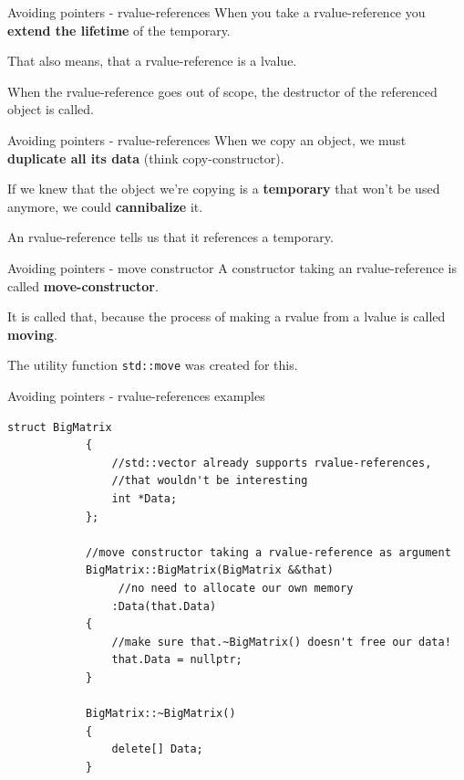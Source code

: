 	\begin{frame}{Avoiding pointers - rvalue-references}
		When you take a rvalue-reference you \textbf{extend the lifetime} of the temporary.
		
		That also means, that a rvalue-reference is a lvalue.
		
		\pause
		
		When the rvalue-reference goes out of scope, the destructor of the referenced object is called.
		
	\end{frame}
	
	\begin{frame}{Avoiding pointers - rvalue-references}
		When we copy an object, we must \textbf{duplicate all its data} (think copy-constructor).
		
		\pause
		
		\emptyline
		If we knew that the object we're copying is a \textbf{temporary} that won't be used anymore, we could \textbf{cannibalize} it.
		
		\pause
		
		\emptyline
		An rvalue-reference tells us that it references a temporary.
	\end{frame}
	
	\begin{frame}{Avoiding pointers - move constructor}
		A constructor taking an rvalue-reference  is called \textbf{move-constructor}.
		
		\pause
		
		\emptyline
		It is called that, because the process of making a rvalue from a lvalue is called \textbf{moving}.
		
		\pause
		
		\emptyline[2]
		The utility function \lstinline|std::move| was created for this.
	\end{frame}
	
	\begin{frame}[fragile=singleslide]{Avoiding pointers - rvalue-references examples}
		\begin{lstlisting}[gobble=12]
			struct BigMatrix
			{
			    //std::vector already supports rvalue-references,
			    //that wouldn't be interesting
			    int *Data;
			};
			
			//move constructor taking a rvalue-reference as argument
			BigMatrix::BigMatrix(BigMatrix &&that)
			     //no need to allocate our own memory
			    :Data(that.Data)
			{
			    //make sure that.~BigMatrix() doesn't free our data!
			    that.Data = nullptr;
			}
			
			BigMatrix::~BigMatrix()
			{
			    delete[] Data;
			}
		\end{lstlisting}
	\end{frame}
	
